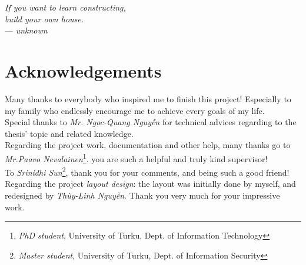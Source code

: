 

\begin{flushright}{\slshape    
If you want to learn constructing, \\
build your own house.} \\ \medskip
--- \emph{unknown}
\end{flushright}

\bigskip


\begingroup

\let\clearpage\relax
\let\cleardoublepage\relax
\let\cleardoublepage\relax

\chapter*{Acknowledgements} %

\noindent Many thanks to everybody who inspired me to finish this project! 
Especially to my family who endlessly encourage me to achieve every goals of my life.  \\

\noindent Special thanks to \emph{Mr. Ng\d{o}c-Quang Nguy\~{\^{e}}n} for technical advices regarding to the thesis' topic and related knowledge. \\

\noindent Regarding the project work, documentation and other help, many thanks go to \emph{Mr.Paavo Nevalainen}\footnote{\emph{PhD student}, University of Turku,  Dept. of Information Technology}. you are such a helpful and truly kind supervisor! \\

\noindent To \emph{Srinidhi Sun}\footnote{\emph{Master student}, University of Turku,  Dept. of Information Security}, thank you for your comments, and being such a good friend! \\

\noindent Regarding the project \emph{layout design}: the layout was initially done by myself, and redesigned by \emph{Th\`{u}y-Linh Nguy\~{\^{e}}n}. Thank you very much for your impressive work.

\endgroup
